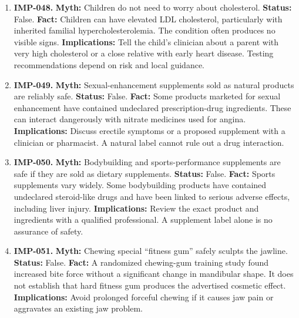 \documentclass[11pt,oneside]{book}
\begin{document}
\begin{enumerate}[leftmargin=0pt,labelwidth=0pt,labelsep=0pt,itemindent=0pt]
\item[] \textbf{IMP-048.} \textbf{Myth:} Children do not need to worry about cholesterol.\newline
\textbf{Status:} False.\newline
\textbf{Fact:} Children can have elevated LDL cholesterol, particularly with inherited familial hypercholesterolemia. The condition often produces no visible signs. \cite{ref410}\newline
\textbf{Implications:} Tell the child's clinician about a parent with very high cholesterol or a close relative with early heart disease. Testing recommendations depend on risk and local guidance.
\item[] \textbf{IMP-049.} \textbf{Myth:} Sexual-enhancement supplements sold as natural products are reliably safe.\newline
\textbf{Status:} False.\newline
\textbf{Fact:} Some products marketed for sexual enhancement have contained undeclared prescription-drug ingredients. These can interact dangerously with nitrate medicines used for angina. \cite{ref414}\newline
\textbf{Implications:} Discuss erectile symptoms or a proposed supplement with a clinician or pharmacist. A natural label cannot rule out a drug interaction.
\item[] \textbf{IMP-050.} \textbf{Myth:} Bodybuilding and sports-performance supplements are safe if they are sold as dietary supplements.\newline
\textbf{Status:} False.\newline
\textbf{Fact:} Sports supplements vary widely. Some bodybuilding products have contained undeclared steroid-like drugs and have been linked to serious adverse effects, including liver injury. \cite{ref415}\newline
\textbf{Implications:} Review the exact product and ingredients with a qualified professional. A supplement label alone is no assurance of safety.
\item[] \textbf{IMP-051.} \textbf{Myth:} Chewing special ``fitness gum'' safely sculpts the jawline.\newline
\textbf{Status:} False.\newline
\textbf{Fact:} A randomized chewing-gum training study found increased bite force without a significant change in mandibular shape. It does not establish that hard fitness gum produces the advertised cosmetic effect. \cite{ref416}\newline
\textbf{Implications:} Avoid prolonged forceful chewing if it causes jaw pain or aggravates an existing jaw problem.

\end{enumerate}
\end{document}
